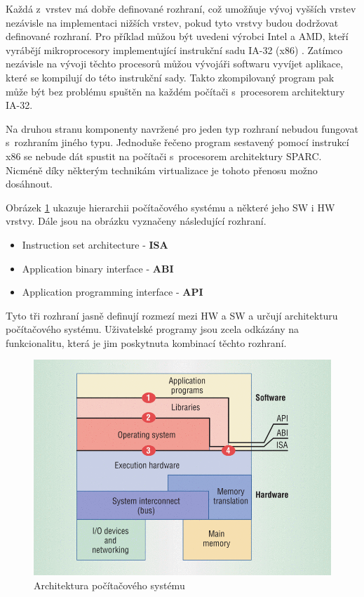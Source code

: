 Každá z~vrstev má dobře definované rozhraní, což umožňuje vývoj vyšších vrstev nezávisle na implementaci nižších vrstev,
pokud tyto vrstvy budou dodržovat definované rozhraní. Pro příklad můžou být uvedeni výrobci Intel a AMD, kteří vyrábějí
mikroprocesory implementující instrukční sadu IA-32 (x86) \cite{book:iee:vm_architecture}. Zatímco nezávisle na vývoji
těchto procesorů můžou vývojáři softwaru vyvíjet aplikace, které se kompilují do této instrukční sady. Takto zkompilovaný
program pak může být bez problému spuštěn na každém počítači s~procesorem architektury IA-32.

Na druhou stranu komponenty navržené pro jeden typ rozhraní nebudou fungovat s~rozhraním jiného typu. Jednoduše řečeno program
sestavený pomocí instrukcí x86 se nebude dát spustit na počítači s~procesorem architektury SPARC. Nicméně díky některým technikám
virtualizace je tohoto přenosu možno dosáhnout. 

Obrázek \ref{figure:computer_architecture} ukazuje hierarchii počítačového systému a některé jeho SW i HW vrstvy. Dále jsou
na obrázku vyznačeny následující rozhraní.
\begin{itemize}
  \item Instruction set architecture - \textbf{ISA}
  \item Application binary interface - \textbf{ABI}
  \item Application programming interface - \textbf{API}
\end{itemize}
Tyto tři rozhraní jasně definují rozmezí mezi HW a SW a určují architekturu počítačového systému. Uživatelské programy jsou
zcela odkázány na funkcionalitu, která je jim poskytnuta kombinací těchto rozhraní.
\begin{figure}
  \centering
  \includegraphics[scale=0.3]{assets/png/ca.png}
  \caption[Architektura počítačového systému]{Architektura počítačového systému \cite{book:iee:vm_architecture}}
  \label{figure:computer_architecture}
\end{figure}
